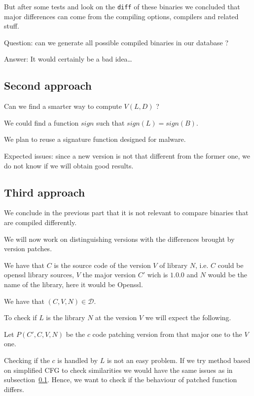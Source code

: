 \documentclass{article}
\newcommand{\signature}{{sign}}
\begin{document}
    But after some tests and look on the \verb|diff| of these binaries we
    concluded that major differences can come from the compiling options,
    compilers and related stuff.

    Question: can we generate all possible compiled binaries in our database ? 
    
    Answer: It would certainly be a bad idea\dots

    \subsection{Second approach}\label{approach-sign}
    Can we find a smarter way to compute $V(L,D)$ ?

    We could find a function $\signature$ such that $\signature(L) =
    \signature(B)$.

    We plan to reuse a signature function designed for malware.

    Expected issues: since a new version is not that different from the former
    one, we do not know if we will obtain good results.

    \subsection{Third approach}
    We conclude in the previous part that it is not relevant to compare
    binaries that are compiled differently. 

    We will now work on distinguishing versions with the differences brought
    by version patches.


    We have that $C$ is the source code of the version $V$ of library $N$,
    i.e. $C$ could be openssl library sources, $V$ the major version $C'$ wich
    is $1.0.0$ and
    $N$ would be the name of the library, here it would be Openssl.

    We have that $(C,V,N) \in \mathcal{D}$.

    To check if $L$ is the library $N$ at the version $V$ we will expect the
    following.

    Let $P(C',C,V,N)$ be the $c$ code patching version from that major one to
    the $V$ one.

    Checking if the $c$ is handled by $L$ is not an easy problem. If we try
    method based on simplified CFG to check similarities we would have the
    same issues as in subsection~\ref{approach-sign}. Hence, we want to check
    if the behaviour of patched function differs.
\end{document}
